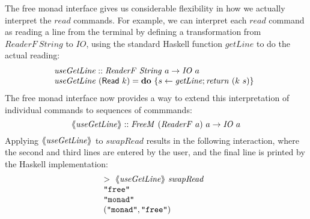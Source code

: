 \documentclass{jfp1}
\newcommand{\fmext}[1]{\langle\kern-0.25em\langle #1 \rangle\kern-0.25em\rangle}
\newcommand{\kw}[1]{\textbf{#1}}
\begin{document}
The free monad interface gives us considerable flexibility in how we
actually interpret the $\mathit{read}$ commands. For example, we can
interpret each $\mathit{read}$ command as reading a line from the
terminal by defining a transformation from
$\mathit{ReaderF}~\mathit{String}$ to $\mathit{IO}$, using the
standard Haskell function $\mathit{getLine}$ to do the actual reading:
\begin{displaymath}
  \begin{array}{@{}l}
    \mathit{useGetLine} :: \mathit{ReaderF}~\mathit{String}~a \to \mathit{IO}~a \\
    \mathit{useGetLine}~(\mathsf{Read}~k) = \kw{do}~\{ s \leftarrow \mathit{getLine}; \mathit{return}~(k~s) \}
  \end{array}
\end{displaymath}
The free monad interface now provides a way to extend this
interpretation of individual commands to sequences of commmands:
\begin{displaymath}
  \fmext{\mathit{useGetLine}} :: \mathit{FreeM}~(\mathit{ReaderF}~a)~a \to \mathit{IO}~a
\end{displaymath}
Applying $\fmext{\mathit{useGetLine}}$ to $\mathit{swapRead}$ results
in the following interaction, where the second and third lines are
entered by the user, and the final line is printed by the Haskell
implementation:
\begin{displaymath}
  \begin{array}{@{}l}
    >~\fmext{\mathit{useGetLine}}~\mathit{swapRead} \\
    \texttt{"free"} \\
    \texttt{"monad"} \\
    (\texttt{"monad"}, \texttt{"free"})
  \end{array}
\end{displaymath}
\end{document}
